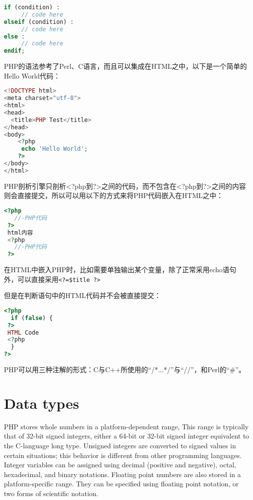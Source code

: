 \begin{lstlisting}[language=PHP]
if (condition) :
     // code here
elseif (condition) :
     // code here
else :
     // code here
endif;
\end{lstlisting}






PHP的语法参考了Perl、C语言，而且可以集成在HTML之中，以下是一个简单的Hello World代码：

\begin{lstlisting}[language=PHP]
<!DOCTYPE html>
<meta charset="utf-8">
<html>
<head>
  <title>PHP Test</title>
</head>
<body>
	<?php
	 echo 'Hello World';
	?>
</body>
</html>
\end{lstlisting}

PHP剖析引擎只剖析<?php到?>之间的代码，而不包含在<?php到?>之间的内容则会直接提交，所以可以用以下的方式来将PHP代码嵌入在HTML之中：

\begin{lstlisting}[language=PHP]
 <?php
   //-PHP代码
 ?>
 html内容
 <?php
   //-PHP代码
 ?>
\end{lstlisting}

在HTML中嵌入PHP时，比如需要单独输出某个变量，除了正常采用echo语句外，可以直接采用\verb|<?=$title ?>|

但是在判断语句中的HTML代码并不会被直接提交：


\begin{lstlisting}[language=PHP]
<?php
  if (false) {
 ?>
 HTML Code
 <?php
  }
?>
\end{lstlisting}

PHP可以用三种注解的形式：C与C++所使用的“/*...*/”与“//”，和Perl的“\#”。




\chapter{Data types}

PHP stores whole numbers in a platform-dependent range, This range is typically that of 32-bit signed integers, either a 64-bit or 32-bit signed integer equivalent to the C-language long type. Unsigned integers are converted to signed values in certain situations; this behavior is different from other programming languages. Integer variables can be assigned using decimal (positive and negative), octal, hexadecimal, and binary notations. Floating point numbers are also stored in a platform-specific range. They can be specified using floating point notation, or two forms of scientific notation. 


